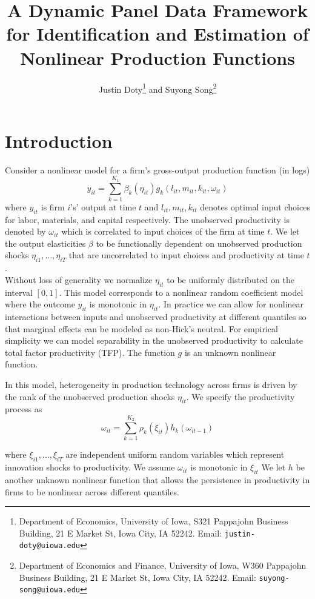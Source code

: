 \documentclass{article}
\title{A Dynamic Panel Data Framework for Identification and Estimation of Nonlinear Production Functions}
\author{Justin Doty\thanks{Department of Economics, University of Iowa, S321 Pappajohn Business Building, 21 E Market St, Iowa City, IA 52242. Email: \texttt{justin-doty@uiowa.edu}} and Suyong Song\thanks{Department of Economics and Finance, University of Iowa, W360 Pappajohn Business Building, 21 E Market St, Iowa City, IA 52242. Email: \texttt{suyong-song@uiowa.edu}}
}
\date{\vspace{-5ex}}
\begin{document}
\maketitle{} 
\section{Introduction}

Consider a nonlinear model for a firm's gross-output production function (in logs)
\begin{equation}\label{modely}
y_{it}=\sum_{k=1}^{K_{1}}\beta_{k}(\eta_{it})g_{k}(l_{it}, m_{it}, k_{it}, \omega_{it})
\end{equation}
where $y_{it}$ is firm $i$'s' output at time $t$ and $l_{it}, m_{it}, k_{it}$ denotes optimal input choices for labor, materials, and capital respectively. The unobserved productivity is denoted by $\omega_{it}$ which is correlated to input choices of the firm at time $t$. We let the output elasticities $\beta$ to be functionally dependent on unobserved production shocks $\eta_{i1},\dots, \eta_{iT}$ that are uncorrelated to input choices and productivity at time $t$.\\

Without loss of generality we normalize $\eta_{it}$ to be uniformly distributed on the interval $[0,1]$. This model corresponds to a nonlinear random coefficient model where the outcome $y_{it}$ is monotonic in $\eta_{it}$. In practice we can allow for nonlinear interactions between inputs and unobserved productivity at different quantiles so that marginal effects can be modeled as non-Hick's neutral. For empirical simplicity we can model separability in the unobserved productivity to calculate total factor productivity (TFP). The function $g$ is an unknown nonlinear function.

In this model, heterogeneity in production technology across firms is driven by the rank of the unobserved production shocks $\eta_{it}$. We specify the productivity process as
\begin{equation}\label{modelw}
\omega_{it}=\sum_{k=1}^{K_{2}}\rho_{k}(\xi_{it})h_{k}(\omega_{it-1})
\end{equation}

where $\xi_{i1},\dots, \xi_{iT}$ are independent uniform random variables which represent innovation shocks to productivity. We assume $\omega_{it}$ is monotonic in $\xi_{it}$ We let $h$ be another unknown nonlinear function that allows the persistence in productivity in firms to be nonlinear across different quantiles.
\end{document}
